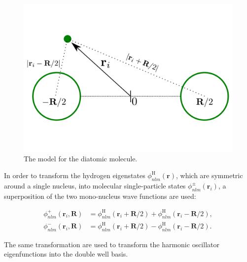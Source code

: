 \begin{frame}
 \begin{figure}
 \begin{center}
  \includegraphics[scale=0.3]{../graphics/Molecules.pdf}
  \caption{The model for the diatomic molecule.}
 \end{center}
\end{figure}
\end{frame}

\begin{frame}
 In order to transform the hydrogen eigenstates $\phi_{nlm}^\mathrm{H}(\mathbf{r})$, which are symmetric around a single nucleus, into molecular single-particle states $\phi_{nlm}^\pm (\mathbf{r}_i)$, a superposition of the two mono-nucleus wave functions are used:

\begin{align*}
 \phi_{nlm}^+ (\mathbf{r}_i, \mathbf{R}) &= \phi_{nlm}^\mathrm{H}(\mathbf{r}_i + \mathbf{R}/2) + \phi_{nlm}^\mathrm{H}(\mathbf{r}_i - \mathbf{R}/2)\label{eq:moleculeTransPlus}, \\
 \phi_{nlm}^- (\mathbf{r}_i, \mathbf{R}) &= \phi_{nlm}^\mathrm{H}(\mathbf{r}_i + \mathbf{R}/2) - \phi_{nlm}^\mathrm{H}(\mathbf{r}_i - \mathbf{R}/2)\label{eq:moleculeTransMin}.
\end{align*}
\shift 

The same transformation are used to transform the harmonic oscillator eigenfunctions into the double well basis.

\end{frame}



